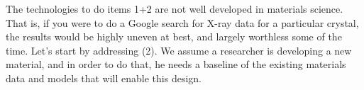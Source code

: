 The technologies to do items 1+2 are not well developed in materials science. That is, if you were to do a Google search for X-ray data for a particular crystal, the results would be highly uneven at best, and largely worthless some of the time.  Let’s start by addressing (2).  We assume a researcher is developing a new material, and in order to do that, he needs a baseline of the existing materials data and models that will enable this design.  

\cite{Warren_2012}
\cite{OECD}
\cite{Ward_2014}

